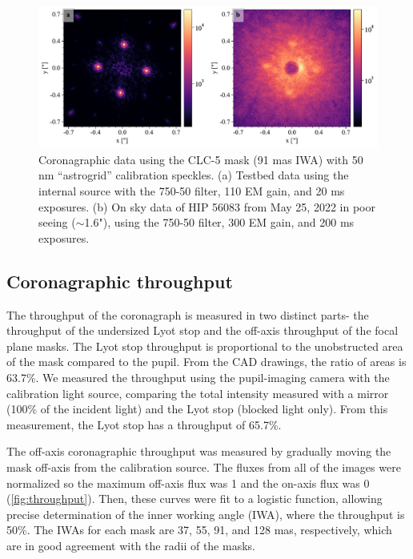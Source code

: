 \documentclass[]{spie}  %
\begin{document}
\begin{figure}
   \centering
   \includegraphics[width=\textwidth]{figures/astrogrid_psf}
   \caption{Coronagraphic data using the CLC-5 mask (91 mas IWA) with  50 nm ``astrogrid'' calibration speckles. (a) Testbed data using the internal source with the 750-50 filter, 110 EM gain, and 20 ms exposures. (b) On sky data of HIP 56083 from May 25, 2022 in poor seeing ($\sim$1.6"), using the 750-50 filter, 300 EM gain, and 200 ms exposures.}\label{fig:satellite-spots}
\end{figure}

\subsection{Coronagraphic throughput}

The throughput of the coronagraph is measured in two distinct parts- the throughput of the undersized Lyot stop and the off-axis throughput of the focal plane masks. The Lyot stop throughput is proportional to the unobstructed area of the mask compared to the pupil. From the CAD drawings, the ratio of areas is 63.7\%. We measured the throughput using the pupil-imaging camera with the calibration light source, comparing the total intensity measured with a mirror (100\% of the incident light) and the Lyot stop (blocked light only). From this measurement, the Lyot stop has a throughput of 65.7\%.

The off-axis coronagraphic throughput was measured by gradually moving the mask off-axis from the calibration source. The fluxes from all of the images were normalized so the maximum off-axis flux was 1 and the on-axis flux was 0 (\autoref{fig:throughput}). Then, these curves were fit to a logistic function, allowing precise determination of the inner working angle (IWA), where the throughput is 50\%. The IWAs for each mask are 37, 55, 91, and 128 mas, respectively, which are in good agreement with the radii of the masks.
\end{document}
